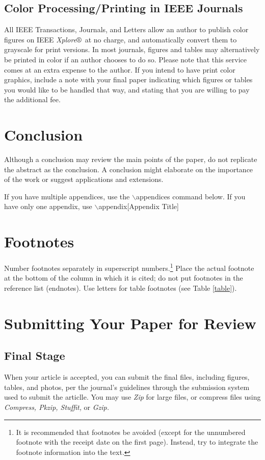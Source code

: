 \documentclass{ieeeaccess}
\begin{document}
\subsection{Color Processing/Printing in IEEE Journals}
All IEEE Transactions, Journals, and Letters allow an author to publish color
figures on IEEE {\it Xplore}$\circledR$\ at no charge, and automatically
convert them to grayscale for print versions. In most journals, figures and
tables may alternatively be printed in color if an author chooses to do so.
Please note that this service comes at an extra expense to the author. If you
intend to have print color graphics, include a note with your final paper
indicating which figures or tables you would like to be handled that way, and
stating that you are willing to pay the additional fee.

\section{Conclusion}
Although a conclusion may review the main points of the paper, do not replicate
the abstract as the conclusion. A conclusion might elaborate on the importance
of the work or suggest applications and extensions.

If you have multiple appendices, use the $\backslash$appendices command below.
If you have only one appendix, use $\backslash$appendix[Appendix Title]

\appendices
\section{\break Footnotes}
Number footnotes separately in superscript numbers.\footnote{It is recommended
	that footnotes be avoided (except for the unnumbered footnote with the receipt
	date on the first page). Instead, try to integrate the footnote information
	into the text.} Place the actual footnote at the bottom of the column in which
it is cited; do not put footnotes in the reference list (endnotes). Use letters
for table footnotes (see Table \ref{table}).

\section{\break Submitting Your Paper for Review}

\subsection{Final Stage}
When your article is accepted, you can submit the final files, including
figures, tables, and photos, per the journal's guidelines through the
submission system used to submit the articlle. You may use \emph{Zip} for large
files, or compress files using \emph{Compress, Pkzip, Stuffit,} or \emph{Gzip.}
\end{document}
